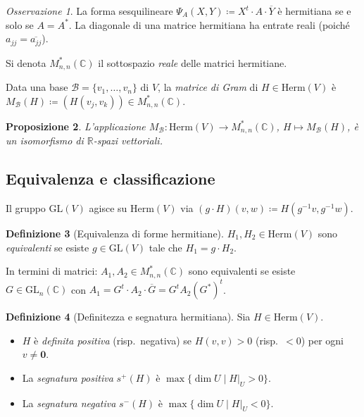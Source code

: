 \documentclass[11pt, a4paper]{book}
\theoremstyle{definition}
\newtheorem{definizione}{Definizione}[section]
\theoremstyle{plain}
\newtheorem{proposizione}[definizione]{Proposizione}
\theoremstyle{remark}
\newtheorem{osservazione}[definizione]{Osservazione}
\newcommand{\R}{\mathbb{R}}
\newcommand{\C}{\mathbb{C}}
\newcommand{\GL}{\mathrm{GL}}
\begin{document}
\begin{osservazione}
La forma sesquilineare $\Psi_A(X,Y) \coloneqq X^t \cdot A \cdot \overline{Y}$ è hermitiana se e solo se $A = A^*$. La diagonale di una matrice hermitiana ha entrate reali (poiché $a_{jj} = \overline{a_{jj}}$).
\end{osservazione}

Si denota $M^*_{n,n}(\C)$ il sottospazio \emph{reale} delle matrici hermitiane.

Data una base $\mathcal{B} = \{v_1,\ldots,v_n\}$ di $V$, la \emph{matrice di Gram} di $H \in \mathrm{Herm}(V)$ è $M_\mathcal{B}(H) \coloneqq (H(v_j,v_k)) \in M^*_{n,n}(\C)$.

\begin{proposizione}
L'applicazione $M_\mathcal{B} \colon \mathrm{Herm}(V) \to M^*_{n,n}(\C)$, $H \mapsto M_\mathcal{B}(H)$, è un isomorfismo di $\R$-spazi vettoriali.
\end{proposizione}

\subsection{Equivalenza e classificazione}

Il gruppo $\GL(V)$ agisce su $\mathrm{Herm}(V)$ via $(g \cdot H)(v,w) \coloneqq H(g^{-1}v,g^{-1}w)$.

\begin{defbox}
\begin{definizione}[Equivalenza di forme hermitiane]
$H_1, H_2 \in \mathrm{Herm}(V)$ sono \emph{equivalenti} se esiste $g \in \GL(V)$ tale che $H_1 = g \cdot H_2$.
\end{definizione}
\end{defbox}

In termini di matrici: $A_1, A_2 \in M^*_{n,n}(\C)$ sono equivalenti se esiste $G \in \GL_n(\C)$ con $A_1 = G^t \cdot A_2 \cdot \overline{G} = G^t A_2 (G^*)^t$.

\begin{defbox}
\begin{definizione}[Definitezza e segnatura hermitiana]
Sia $H \in \mathrm{Herm}(V)$.
\begin{itemize}
  \item $H$ è \emph{definita positiva} (risp.\ negativa) se $H(v,v) > 0$ (risp.\ $< 0$) per ogni $v \neq \mathbf{0}$.
  \item La \emph{segnatura positiva} $s^+(H)$ è $\max\{\dim U \mid H|_U > 0\}$.
  \item La \emph{segnatura negativa} $s^-(H)$ è $\max\{\dim U \mid H|_U < 0\}$.
\end{itemize}
\end{definizione}
\end{defbox}
\end{document}
